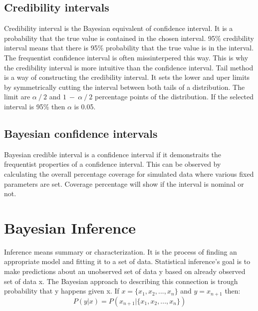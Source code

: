 \subsection*{Credibility intervals}\label{CredibilityIntervals}
Credibility interval is the Bayesian equivalent of confidence interval. It is a probability that the true value is contained in the chosen interval. 95\% credibility interval means that there is 95\% probability that the true value is in the interval. The frequentist confidence interval is often missinterpered this way. This is why the credibility interval is more intuitive than the confidence interval.\cite{FornaconWood2022UnderstandingTD} 
Tail method is a way of constructing the credibility interval. It sets the lower and uper limits by symmetrically cutting the interval between both tails of a distribution. The limit are $\alpha\ /\ 2$ and $1\ -\ \alpha\ /\ 2$ percentage points of the distribution. If the selected interval is 95\% then $\alpha$ is 0.05. \cite{Shi2009BayesianCI}

\subsection{Bayesian confidence intervals}\label{BayesianConfidenceIntervals}
Bayesian credible interval is a confidence interval if it demonstraits the frequentist properties of a confidence interval. This can be observed by calculating the overall percentage coverage for simulated data where various fixed parameters are set. \cite{Pirikahu2016BayesianMO} \cite{Shi2009BayesianCI} Coverage percentage will show if the interval is nominal or not. \cite{Pirikahu2016BayesianMO} 

\section{Bayesian Inference}\label{BayesianInference}
Inference means summary or characterization\cite{Robert2007TheBC}. It is the process of finding an appropriate model and fitting it to a set of data.\cite{Gel2014BayesianDA} Statistical inference's goal is to make predictions about an unobserved set of data y based on already observed set of data x.\cite{Lindley1990The1W}\cite{Gel2014BayesianDA} The Bayesian approach to describing this connection is trough probability that y happens given x. If $x = \{x_1, x_2, ..., x_n \}$ and $y = x_{n + 1}$ then:
\begin{equation}
P(y|x) = P(x_{n + 1}|\{x_1, x_2, ..., x_n \})
\end{equation}

